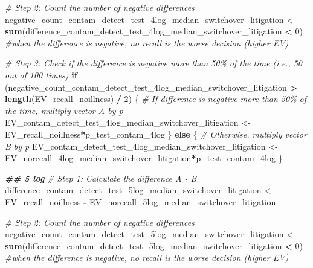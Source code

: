 \documentclass[
]{article}
\newenvironment{Shaded}{\begin{snugshade}}{\end{snugshade}}
\newcommand{\CommentTok}[1]{\textcolor[rgb]{0.56,0.35,0.01}{\textit{#1}}}
\newcommand{\ControlFlowTok}[1]{\textcolor[rgb]{0.13,0.29,0.53}{\textbf{#1}}}
\newcommand{\DecValTok}[1]{\textcolor[rgb]{0.00,0.00,0.81}{#1}}
\newcommand{\DocumentationTok}[1]{\textcolor[rgb]{0.56,0.35,0.01}{\textbf{\textit{#1}}}}
\newcommand{\FunctionTok}[1]{\textcolor[rgb]{0.13,0.29,0.53}{\textbf{#1}}}
\newcommand{\NormalTok}[1]{#1}
\newcommand{\OtherTok}[1]{\textcolor[rgb]{0.56,0.35,0.01}{#1}}
\newcommand{\SpecialCharTok}[1]{\textcolor[rgb]{0.81,0.36,0.00}{\textbf{#1}}}
\begin{document}
\begin{Shaded}
\begin{Highlighting}[]
\CommentTok{\# Step 2: Count the number of negative differences}
\NormalTok{negative\_count\_contam\_detect\_test\_4log\_median\_switchover\_litigation }\OtherTok{\textless{}{-}} \FunctionTok{sum}\NormalTok{(difference\_contam\_detect\_test\_4log\_median\_switchover\_litigation }\SpecialCharTok{\textless{}} \DecValTok{0}\NormalTok{) }\CommentTok{\#when the difference is negative, no recall is the worse decision (higher EV)}

\CommentTok{\# Step 3: Check if the difference is negative more than 50\% of the time (i.e., 50 out of 100 times)}
\ControlFlowTok{if}\NormalTok{ (negative\_count\_contam\_detect\_test\_4log\_median\_switchover\_litigation }\SpecialCharTok{\textgreater{}} \FunctionTok{length}\NormalTok{(EV\_recall\_noillness) }\SpecialCharTok{/} \DecValTok{2}\NormalTok{) \{}
  \CommentTok{\# If difference is negative more than 50\% of the time, multiply vector A by p}
\NormalTok{  EV\_contam\_detect\_test\_4log\_median\_switchover\_litigation }\OtherTok{\textless{}{-}}\NormalTok{ EV\_recall\_noillness}\SpecialCharTok{*}\NormalTok{p\_test\_contam\_4log}
\NormalTok{\} }\ControlFlowTok{else}\NormalTok{ \{}
  \CommentTok{\# Otherwise, multiply vector B by p}
\NormalTok{ EV\_contam\_detect\_test\_4log\_median\_switchover\_litigation  }\OtherTok{\textless{}{-}}\NormalTok{ EV\_norecall\_4log\_median\_switchover\_litigation}\SpecialCharTok{*}\NormalTok{p\_test\_contam\_4log}
\NormalTok{\}}


\DocumentationTok{\#\# 5 log}
\CommentTok{\# Step 1: Calculate the difference A {-} B}
\NormalTok{difference\_contam\_detect\_test\_5log\_median\_switchover\_litigation }\OtherTok{\textless{}{-}}\NormalTok{ EV\_recall\_noillness }\SpecialCharTok{{-}}\NormalTok{ EV\_norecall\_5log\_median\_switchover\_litigation}

\CommentTok{\# Step 2: Count the number of negative differences}
\NormalTok{negative\_count\_contam\_detect\_test\_5log\_median\_switchover\_litigation }\OtherTok{\textless{}{-}} \FunctionTok{sum}\NormalTok{(difference\_contam\_detect\_test\_5log\_median\_switchover\_litigation }\SpecialCharTok{\textless{}} \DecValTok{0}\NormalTok{) }\CommentTok{\#when the difference is negative, no recall is the worse decision (higher EV)}


\end{Highlighting}
\end{Shaded}
\end{document}
